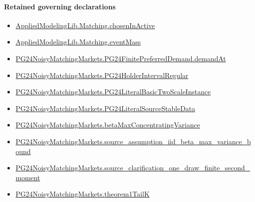 \documentclass[10pt]{article}
\begin{document}
\paragraph{Retained governing declarations}
\begin{itemize}\raggedright
\item \hyperlink{governing-declaration-c5e23e176de5096b}{Applied\allowbreak{}Modeling\allowbreak{}Lib.\allowbreak{}Matching.\allowbreak{}chosen\allowbreak{}In\allowbreak{}Active}
\item \hyperlink{governing-declaration-ca98cd4cb31ef73e}{Applied\allowbreak{}Modeling\allowbreak{}Lib.\allowbreak{}Matching.\allowbreak{}event\allowbreak{}Mass}
\item \hyperlink{governing-declaration-3500d2da6c6aa671}{PG24\allowbreak{}Noisy\allowbreak{}Matching\allowbreak{}Markets.\allowbreak{}PG24\allowbreak{}Finite\allowbreak{}Preferred\allowbreak{}Demand.\allowbreak{}demand\allowbreak{}At}
\item \hyperlink{governing-declaration-34ba25842cf90e86}{PG24\allowbreak{}Noisy\allowbreak{}Matching\allowbreak{}Markets.\allowbreak{}PG24\allowbreak{}Holder\allowbreak{}Interval\allowbreak{}Regular}
\item \hyperlink{governing-declaration-908406134a9242b1}{PG24\allowbreak{}Noisy\allowbreak{}Matching\allowbreak{}Markets.\allowbreak{}PG24\allowbreak{}Literal\allowbreak{}Basic\allowbreak{}Two\allowbreak{}Scale\allowbreak{}Instance}
\item \hyperlink{governing-declaration-c1ccb10f906ac674}{PG24\allowbreak{}Noisy\allowbreak{}Matching\allowbreak{}Markets.\allowbreak{}PG24\allowbreak{}Literal\allowbreak{}Source\allowbreak{}Stable\allowbreak{}Data}
\item \hyperlink{governing-declaration-322e8322d17fd70c}{PG24\allowbreak{}Noisy\allowbreak{}Matching\allowbreak{}Markets.\allowbreak{}beta\allowbreak{}Max\allowbreak{}Concentrating\allowbreak{}Variance}
\item \hyperlink{governing-declaration-106a735d10bd3342}{PG24\allowbreak{}Noisy\allowbreak{}Matching\allowbreak{}Markets.\allowbreak{}source\_\allowbreak{}assumption\_\allowbreak{}iid\_\allowbreak{}beta\_\allowbreak{}max\_\allowbreak{}variance\_\allowbreak{}bound}
\item \hyperlink{governing-declaration-046b66910b6038e5}{PG24\allowbreak{}Noisy\allowbreak{}Matching\allowbreak{}Markets.\allowbreak{}source\_\allowbreak{}clarification\_\allowbreak{}one\_\allowbreak{}draw\_\allowbreak{}finite\_\allowbreak{}second\_\allowbreak{}moment}
\item \hyperlink{governing-declaration-293a20a9c7b67aee}{PG24\allowbreak{}Noisy\allowbreak{}Matching\allowbreak{}Markets.\allowbreak{}theorem1\allowbreak{}Tail\allowbreak{}K}
\end{itemize}
\end{document}
